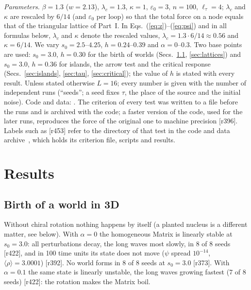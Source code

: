 \documentclass[reprint,pre,amsmath,amssymb,superscriptaddress,nofootinbib]{revtex4-2}
\newcommand{\sz}{s_0}
\begin{document}
\emph{Parameters.} $\beta=1.3$ ($w=2.13$), $\lambda_c=1.3$, $\kappa=1$, $\varepsilon_0=3$, $n=100$, $\ell_\tau=4$; $\lambda_c$ and $\kappa$ are rescaled by $6/14$ (and $\varepsilon_0$ per loop) so that the total force on a node equals that of the triangular lattice of Part~I. In Eqs.~(\ref{eq:z})--(\ref{eq:psi}) and in all formulas below, $\lambda_c$ and $\kappa$ denote the rescaled values, $\lambda_c=1.3\cdot6/14\approx0.56$ and $\kappa=6/14$. We vary $\sz=2.5$--$4.25$, $h=0.24$--$0.39$ and $\alpha=0$--$0.3$. Two base points are used: $\sz=3.0$, $h=0.30$ for the birth of worlds (Secs.~\ref{sec:birth}, \ref{sec:lattices}) and $\sz=3.0$, $h=0.36$ for islands, the arrow test and the critical response (Secs.~\ref{sec:islands}, \ref{sec:tau}, \ref{sec:critical}); the value of $h$ is stated with every result. Unless stated otherwise $L=16$; every number is given with the number of independent runs (``seeds''; a seed fixes $\tau$, the place of the source and the initial noise). Code and data: \cite{code3d}. The criterion of every test was written to a file before the runs and is archived with the code; a faster version of the code, used for the later runs, reproduces the force of the original one to machine precision [r396]. Labels such as [r453] refer to the directory of that test in the code and data archive~\cite{code3d}, which holds its criterion file, scripts and results.


\section{Results}\label{sec:results}
\subsection{Birth of a world in 3D}\label{sec:birth}
Without chiral rotation nothing happens by itself (a planted nucleus is a different matter, see below). With $\alpha=0$ the homogeneous Matrix is linearly stable at $\sz=3.0$: all perturbations decay, the long waves most slowly, in 8 of 8 seeds [r422], and in 100 time units its state does not move ($\psi$ spread $10^{-14}$, $\langle\rho\rangle=3.0001$) [r392]. No world forms in 8 of 8 seeds at $\sz=3.0$ [r373]. With $\alpha=0.1$ the same state is linearly unstable, the long waves growing fastest (7 of 8 seeds) [r422]: the rotation makes the Matrix boil.
\end{document}
